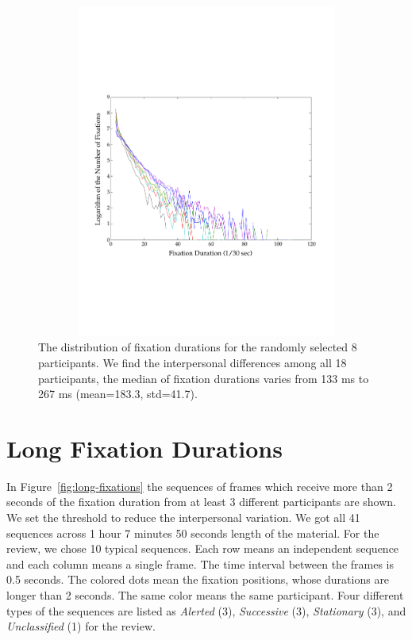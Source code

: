 \documentclass[oneside,master]{snueethesis}
\begin{document}
\begin{figure}
  \centerline{\includegraphics[width=150mm,height=110mm,trim=0mm 60mm 0mm 60mm]{./eps/individual_fixation_duration.pdf}}
  \caption[The distribution of fixation durations for individuals]{The distribution of fixation durations for the randomly selected 8 participants. We find the interpersonal differences among all 18 participants, the median of fixation durations varies from 133 ms to 267 ms (mean=183.3, std=41.7).}
  \label{fig:individual-fixation-duration}
\end{figure}


\section{Long Fixation Durations}
\label{subsec:Long-Fixation-Durations}

In Figure~\ref{fig:long-fixations} the sequences of frames which receive more than 2 seconds of the fixation duration from at least 3 different participants are shown. We set the threshold to reduce the interpersonal variation. We got all 41 sequences across 1 hour 7 minutes 50 seconds length of the material. For the review, we chose 10 typical sequences. Each row means an independent sequence and each column means a single frame. The time interval between the frames is 0.5 seconds. The colored dots mean the fixation positions, whose durations are longer than 2 seconds. The same color means the same participant. Four different types of the sequences are listed as \textit{Alerted} (3), \textit{Successive} (3), \textit{Stationary} (3), and \textit{Unclassified} (1) for the review.
\end{document}
